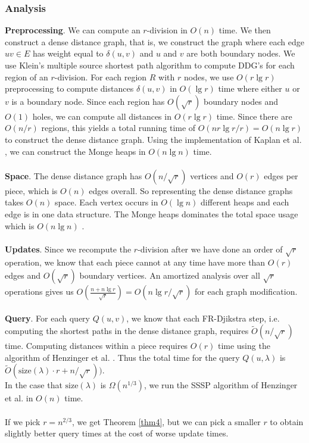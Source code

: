 \subsubsection{Analysis}
\textbf{Preprocessing}.
We can compute an $r$-division in $O(n)$
time. We then
construct a dense distance graph, that is, we construct the graph where each edge $uv\in
E$ has weight equal to $\delta(u,v)$ and $u$ and $v$ are both boundary nodes. We use
Klein's multiple source shortest path algorithm \cite{klein2005multiple} to compute DDG's
for each region of an $r$-division. For each region $R$ with $r$ nodes, we use $O(r\lg
r)$ preprocessing to compute distances $\delta(u,v)$ in $O(\lg r)$ time where either $u$
or $v$ is a boundary node. Since each region has $O(\sqrt{r})$ boundary nodes and $O(1)$
holes, we can compute all distances in $O(r\lg r)$ time. Since there are $O(n/r)$
regions, this yields a total running time of $O(nr\lg r/r)=O(n\lg r)$ to construct the
dense distance graph. Using the implementation of Kaplan et al.
\cite{kaplan2012submatrix}, we can construct the Monge heaps in $O(n\lg n)$ time.\\
\\
\textbf{Space}. The dense distance graph has $O(n/\sqrt{r})$ vertices and $O(r)$ edges
per piece, which is $O(n)$ edges overall. So representing the dense distance graphs takes
$O(n)$ space. Each vertex occurs in $O(\lg n)$ different heaps and each edge is in one
data structure. The Monge heaps dominates the total space usage which is $O(n\lg n)$
\cite{kaplan2012submatrix}. \\
\\
\textbf{Updates}.
 Since we recompute the $r$-division after we have
done an order of $\sqrt{r}$ operation, we know that each piece cannot at any time have
more than $O(r)$ edges and $O(\sqrt{r})$ boundary vertices. An amortized analysis over
all $\sqrt{r}$ operations gives us $O(\frac{n+n\lg r}{\sqrt{r}})=O(n\lg r/\sqrt{r})$ for
each graph modification. \\
\\
\textbf{Query}. For each query $Q(u,v)$, we know that each FR-Djikstra step, i.e. computing
the shortest paths in the dense distance graph, requires $\tilde{O}(n/\sqrt{r})$ time.
Computing distances within a piece requires $O(r)$ time using the algorithm of Henzinger
et al. \cite{henzinger1997faster}. Thus the total time for the query $Q(u,\lambda)$ is
$\tilde{O}(\text{size}(\lambda)\cdot r+n/\sqrt{r}))$. \\
In the case that $\text{size}(\lambda)$ is $\Omega(n^{1/3})$, we run the SSSP algorithm
of Henzinger et al. in $O(n)$ time. \\
\\
If we pick $r=n^{2/3}$, we get Theorem \ref{thm4}, but we can pick a smaller $r$ to obtain
slightly better query times at the cost of worse update times.

